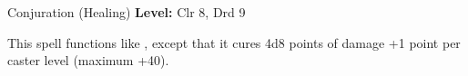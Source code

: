 {Conjuration (Healing)}
{
	\textbf{Level:}
	Clr 8, Drd 9\\
}
{
	This spell functions like , except that it cures 4d8 points of damage +1 point per caster level (maximum +40).

}
